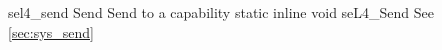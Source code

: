 %
%
%
%

\apidoc
{sel4_send}
{Send}
{Send to a capability}
{static inline void seL4\_Send}
{
}
{\noret}
{See \autoref{sec:sys_send}}
